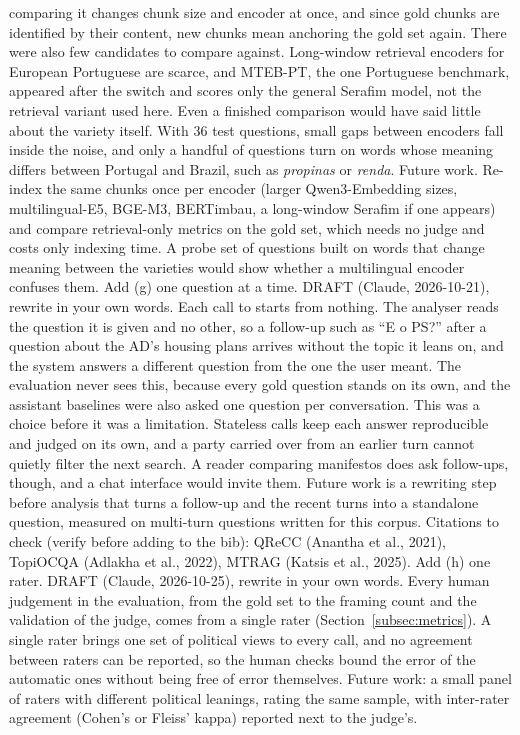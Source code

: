 {comparing it changes chunk size and encoder at once, and since gold chunks are
identified by their content, new chunks mean anchoring the gold set again.
There were also few candidates to compare against. Long-window retrieval
encoders for European Portuguese are scarce, and MTEB-PT, the one Portuguese
benchmark, appeared after the switch and scores only the general Serafim
model, not the retrieval variant used here. Even a finished comparison would
have said little about the variety itself. With 36 test questions, small gaps
between encoders fall inside the noise, and only a handful of questions turn
on words whose meaning differs between Portugal and Brazil, such as
\textit{propinas} or \textit{renda}.
Future work. Re-index the same chunks once per encoder (larger
Qwen3-Embedding sizes, multilingual-E5, BGE-M3, BERTimbau, a long-window
Serafim if one appears) and compare retrieval-only metrics on the gold set,
which needs no judge and costs only indexing time. A probe set of questions
built on words that change meaning between the varieties would show whether a
multilingual encoder confuses them.
Add (g) one question at a time. DRAFT (Claude, 2026-10-21), rewrite in your
own words.
Each call to \sysname{} starts from nothing. The analyser reads the question
it is given and no other, so a follow-up such as ``E o PS?'' after a question
about the AD's housing plans arrives without the topic it leans on, and the
system answers a different question from the one the user meant. The
evaluation never sees this, because every gold question stands on its own,
and the assistant baselines were also asked one question per conversation.
This was a choice before it was a limitation. Stateless calls keep each answer
reproducible and judged on its own, and a party carried over from an earlier
turn cannot quietly filter the next search. A reader comparing manifestos does
ask follow-ups, though, and a chat interface would invite them. Future work is
a rewriting step before analysis that turns a follow-up and the recent turns
into a standalone question, measured on multi-turn questions written for this
corpus. Citations to check (verify before adding to the bib): QReCC (Anantha
et al., 2021), TopiOCQA (Adlakha et al., 2022), MTRAG (Katsis et al., 2025).
Add (h) one rater. DRAFT (Claude, 2026-10-25), rewrite in your own words.
Every human judgement in the evaluation, from the gold set to the framing
count and the validation of the judge, comes from a single rater
(Section~\ref{subsec:metrics}). A single rater brings one set of political
views to every call, and no agreement between raters can be reported, so the
human checks bound the error of the automatic ones without being free of error
themselves. Future work: a small panel of raters with different political
leanings, rating the same sample, with inter-rater agreement (Cohen's or
Fleiss' kappa) reported next to the judge's.}

